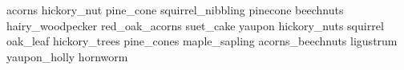 acorns hickory\_nut pine\_cone squirrel\_nibbling pinecone beechnuts hairy\_woodpecker red\_oak\_acorns suet\_cake yaupon hickory\_nuts squirrel oak\_leaf hickory\_trees pine\_cones maple\_sapling acorns\_beechnuts ligustrum yaupon\_holly hornworm 
